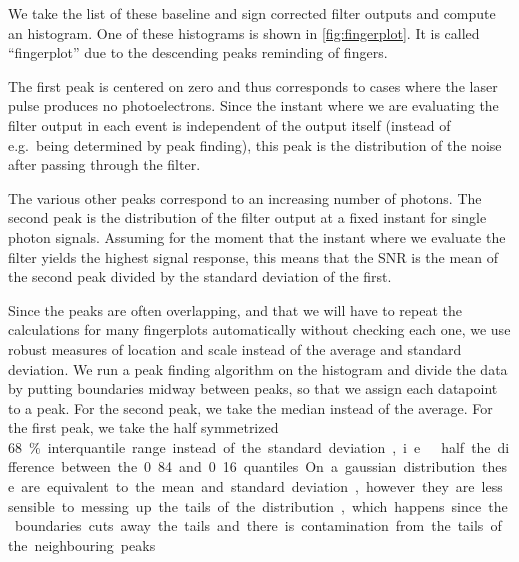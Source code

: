 We take the list of these baseline and sign corrected filter outputs and
compute an histogram. One of these histograms is shown in
\autoref{fig:fingerplot}. It is called ``fingerplot'' due to the descending
peaks reminding of fingers.

\begin{figure}
    

\end{figure}

The first peak is centered on zero and thus corresponds to cases where the
laser pulse produces no photoelectrons. Since the instant where we are
evaluating the filter output in each event is independent of the output itself
(instead of e.g.\ being determined by peak finding), this peak is the
distribution of the noise after passing through the filter.

The various other peaks correspond to an increasing number of photons. The
second peak is the distribution of the filter output at a fixed instant for
single photon signals. Assuming for the moment that the instant where we
evaluate the filter yields the highest signal response, this means that the SNR
is the mean of the second peak divided by the standard deviation of the first.

Since the peaks are often overlapping, and that we will have to repeat the
calculations for many fingerplots automatically without checking each one, we
use robust measures of location and scale instead of the average and standard
deviation. We run a peak finding algorithm on the histogram and divide the data
by putting boundaries midway between peaks, so that we assign each datapoint to
a peak. For the second peak, we take the median instead of the average. For the
first peak, we take the half symmetrized \SI{68}\% interquantile range instead
of the standard deviation, i.e.\ half the difference between the 0.84 and 0.16
quantiles. On a gaussian distribution these are equivalent to the mean and
standard deviation, however they are less sensible to messing up the tails of
the distribution, which happens since the boundaries cuts away the tails and
there is contamination from the tails of the neighbouring peaks.


